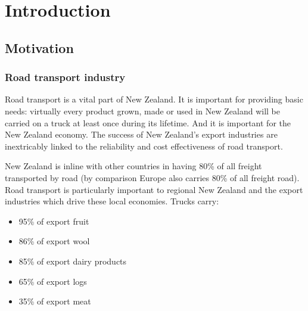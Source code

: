 
\chapter{Introduction}


\section{Motivation}



\subsection{Road transport industry}

Road transport is a vital part of New Zealand. It is important for providing basic needs: virtually every product grown, made or used in New Zealand will be carried on a truck at least once during its lifetime\cite{RTFNZ}. And it is important for the New Zealand economy. The success of New Zealand's export industries are inextricably linked to the reliability and cost effectiveness of road transport.

New Zealand is inline with other countries in having 80\% of all freight transported by road (by comparison Europe also carries 80\% of all freight road). Road transport is particularly important to regional New Zealand and the export industries which drive these local economies. Trucks carry\cite{RTFNZ}:
\begin{itemize}
	\item 95\% of export fruit
	\item 86\% of export wool
	\item 85\% of export dairy products
	\item 65\% of export logs
	\item 35\% of export meat
\end{itemize}

